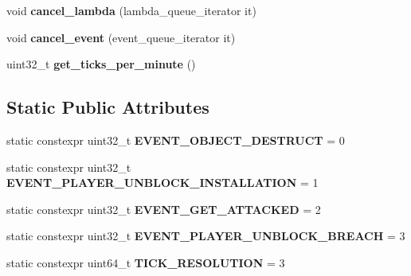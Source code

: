 \begin{DoxyCompactItemize}
\mbox{\label{classmods_1_1deferred_acbd4699c918bcaaa129e46a26c43da16}} 
void {\bfseries cancel\+\_\+lambda} (lambda\+\_\+queue\+\_\+iterator it)
\item 
\mbox{\label{classmods_1_1deferred_a1ccc63aa64057b4e5e1819816417f041}} 
void {\bfseries cancel\+\_\+event} (event\+\_\+queue\+\_\+iterator it)
\item 
\mbox{\label{classmods_1_1deferred_a80b0c114610dfcfb48292f95a7ffda8e}} 
uint32\+\_\+t {\bfseries get\+\_\+ticks\+\_\+per\+\_\+minute} ()
\end{DoxyCompactItemize}
\subsection*{Static Public Attributes}
\begin{DoxyCompactItemize}
\item 
\mbox{\label{classmods_1_1deferred_af4e84e4394187efdeb48f6a27b811aed}} 
static constexpr uint32\+\_\+t {\bfseries E\+V\+E\+N\+T\+\_\+\+O\+B\+J\+E\+C\+T\+\_\+\+D\+E\+S\+T\+R\+U\+CT} = 0
\item 
\mbox{\label{classmods_1_1deferred_a875a87df39bf4ed34f281a59e0c7a18f}} 
static constexpr uint32\+\_\+t {\bfseries E\+V\+E\+N\+T\+\_\+\+P\+L\+A\+Y\+E\+R\+\_\+\+U\+N\+B\+L\+O\+C\+K\+\_\+\+I\+N\+S\+T\+A\+L\+L\+A\+T\+I\+ON} = 1
\item 
\mbox{\label{classmods_1_1deferred_ab5c5f5b79e4690006471a0253f9fb2db}} 
static constexpr uint32\+\_\+t {\bfseries E\+V\+E\+N\+T\+\_\+\+G\+E\+T\+\_\+\+A\+T\+T\+A\+C\+K\+ED} = 2
\item 
\mbox{\label{classmods_1_1deferred_a7e8c5a393917f9234e2fbdc8a79c9a31}} 
static constexpr uint32\+\_\+t {\bfseries E\+V\+E\+N\+T\+\_\+\+P\+L\+A\+Y\+E\+R\+\_\+\+U\+N\+B\+L\+O\+C\+K\+\_\+\+B\+R\+E\+A\+CH} = 3
\item 
\mbox{\label{classmods_1_1deferred_a5f85f1db9acec899e3fc93e0c10aa050}} 
static constexpr uint64\+\_\+t {\bfseries T\+I\+C\+K\+\_\+\+R\+E\+S\+O\+L\+U\+T\+I\+ON} = 3
\end{DoxyCompactItemize}
